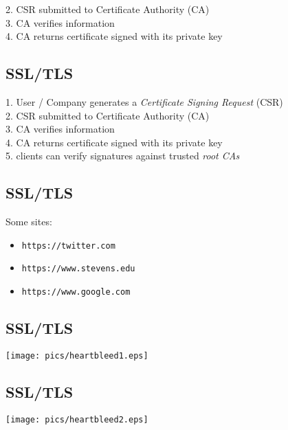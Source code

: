\documentclass[xga]{xdvislides}
\begin{document}
2. CSR submitted to Certificate Authority (CA) \\

3. CA verifies information \\

4. CA returns certificate signed with its private key \\

\subsection{SSL/TLS}
1. User / Company generates a {\em Certificate Signing Request} (CSR) \\

2. CSR submitted to Certificate Authority (CA) \\

3. CA verifies information \\

4. CA returns certificate signed with its private key \\

5. clients can verify signatures against trusted {\em root CAs} \\


\subsection{SSL/TLS}
Some sites:

\begin{itemize}
	\item {\tt https://twitter.com}
	\item {\tt https://www.stevens.edu}
	\item {\tt https://www.google.com}
\end{itemize}

\subsection{SSL/TLS}
\vspace*{\fill}
\begin{center}
	\texttt{[image: pics/heartbleed1.eps]} \\
\end{center}
\vspace*{\fill}

\subsection{SSL/TLS}
\vspace*{\fill}
\begin{center}
	\texttt{[image: pics/heartbleed2.eps]} \\
\end{center}
\vspace*{\fill}
\end{document}
